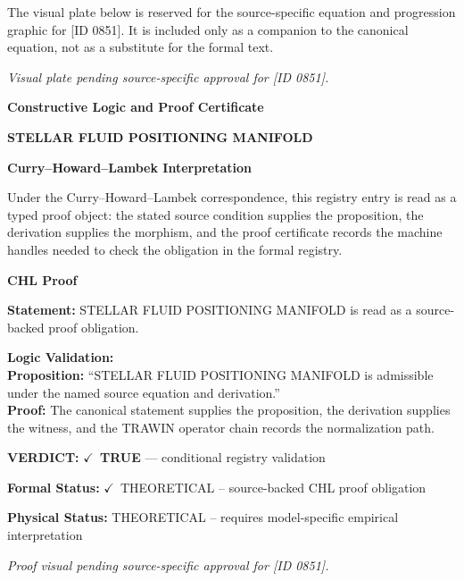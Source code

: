 \begingroup\footnotesize\sloppy
The visual plate below is reserved for the source-specific equation and progression graphic for [ID 0851]. It is included only as a companion to the canonical equation, not as a substitute for the formal text.
\par\endgroup
\begingroup\footnotesize\itshape
Visual plate pending source-specific approval for [ID 0851].
\par\endgroup

\clearpage
\begingroup\tzpsupportsetup
\noindent\textbf{\fontsize{10.8pt}{12.8pt}\selectfont [ID 0851] Constructive Logic and Proof Certificate}\par
\noindent\textbf{\fontsize{10pt}{12pt}\selectfont STELLAR FLUID POSITIONING MANIFOLD}\par
\vspace{0.45em}
\begingroup
\footnotesize
\setlength{\parskip}{0.22em}
\setlength{\parindent}{0pt}
\noindent\textbf{Curry--Howard--Lambek Interpretation}\par
Under the Curry--Howard--Lambek correspondence, this registry entry is read as a typed proof
object: the stated source condition supplies the proposition, the derivation supplies the
morphism, and the proof certificate records the machine handles needed to check the obligation
in the formal registry.

\vspace{0.45em}
\noindent\textbf{CHL Proof}\par
\textbf{Statement:} STELLAR FLUID POSITIONING MANIFOLD is read as a source-backed proof obligation.

\textbf{Logic Validation:}\\
\textbf{Proposition:} ``STELLAR FLUID POSITIONING MANIFOLD is admissible under the named source equation and derivation.''\\
\textbf{Proof:} The canonical statement supplies the proposition, the derivation supplies the witness, and the TRAWIN operator chain records the normalization path.

\textbf{VERDICT:} \ensuremath{\checkmark}\ \textbf{TRUE} --- conditional registry validation

\textbf{Formal Status:} \ensuremath{\checkmark}\ THEORETICAL -- source-backed CHL proof obligation

\textbf{Physical Status:} THEORETICAL -- requires model-specific empirical interpretation
\par\vspace{0.45em}
\par
\vfill
\begingroup\footnotesize\itshape
Proof visual pending source-specific approval for [ID 0851].
\par\endgroup
\vfill
\endgroup
\endgroup
